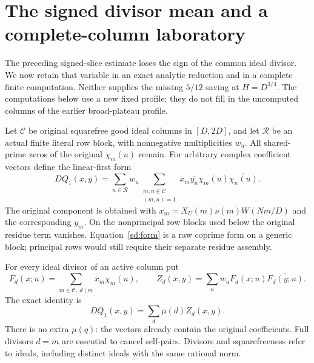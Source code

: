 \section{The signed divisor mean and a complete-column laboratory}\label{sd:core}
The preceding signed-slice estimate loses the sign of the common ideal
 divisor. We now retain that variable in an exact analytic reduction and
in a complete finite computation. Neither supplies the missing
$5/12$ saving at $H=D^{3/4}$. The computations below use a new fixed
profile; they do not fill in the uncomputed columns of the earlier
broad-plateau profile.

Let $\mathcal C$ be original squarefree good ideal columns in $[D,2D]$,
and let $\mathcal R$ be an actual finite literal row block, with
nonnegative multiplicities $w_u$. All shared-prime zeros of the original
$\chi_m(u)$ remain. For arbitrary complex coefficient vectors define the
linear-first form
\begin{equation}\label{sd:form}
 DQ_1(x,y)=\sum_{u\in\mathcal R}w_u
 \sum_{\substack{m,n\in\mathcal C\\(m,n)=1}}
 x_m\overline{y_n}\chi_m(u)\overline{\chi_n(u)}.
\end{equation}
The original component is obtained with
$x_m=X_U(m)\nu(m)W(Nm/D)$ and the corresponding $y_m$.
On the nonprincipal row blocks used below the original residue term
vanishes. Equation~\eqref{sd:form} is a raw coprime form on a generic
block; principal rows would still require their separate residue assembly.

For every ideal divisor of an active column put
\[
 F_d(x;u)=\sum_{m\in\mathcal C,\ d\mid m}x_m\chi_m(u),\qquad
 Z_d(x,y)=\sum_u w_uF_d(x;u)\overline{F_d(y;u)}.
\]
The exact identity is
\begin{equation}\label{sd:incidence}
 DQ_1(x,y)=\sum_d\mu(d)Z_d(x,y).
\end{equation}
There is no extra $\mu(q)$: the vectors already contain the original
coefficients. Full divisors $d=m$ are essential to cancel self-pairs.
Divisors and squarefreeness refer to ideals, including distinct ideals
with the same rational norm.

